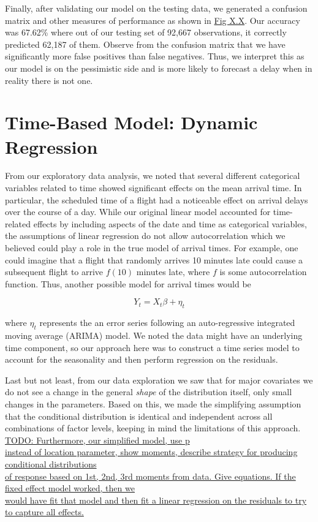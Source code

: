 \documentclass[12pt, a4paper, openany]{book}
\newcommand\tab[1][1cm]{\hspace*{#1}}
\begin{document}
	\tab Finally, after validating our model on the testing data, we generated a confusion matrix and other measures of performance as shown in \underline{Fig X.X}. Our accuracy was 67.62\% where out of our testing set of 92,667 observations, it correctly predicted 62,187 of them. Observe from the confusion matrix that we have significantly more false positives than false negatives. Thus, we interpret this as our model is on the pessimistic side and is more likely to forecast a delay when in reality there is not one. \\

	\section{Time-Based Model: Dynamic Regression}
	\tab From our exploratory data analysis, we noted that several different categorical variables related to time showed significant effects on the mean arrival time. In particular, the scheduled time of a flight had a noticeable effect on arrival delays over the course of a day. While our original linear model accounted for time-related effects by including aspects of the date and time as categorical variables, the assumptions of linear regression do not allow autocorrelation which we believed could play a role in the true model of arrival times. For example, one could imagine that a flight that randomly arrives 10 minutes late could cause a subsequent flight to arrive $f(10)$ minutes late, where $f$ is some autocorrelation function. Thus, another possible model for arrival times would be 
	\begin{center}
	$$Y_t = X_t\beta + \eta_t$$
	\end{center}
	where $\eta_t$ represents the an error series following an auto-regressive integrated moving average (ARIMA) model. We noted the data might have an underlying time component, so our approach here was to construct a time series model to account for the seasonality and then perform regression on the residuals. 

	\tab Last but not least, from our data exploration we saw that for major covariates we do not see a change in the general \textit{shape} of the distribution itself, only small changes in the parameters. Based on this, we made the simplifying assumption that the conditional distribution is identical and independent across all combinations of factor levels, keeping in mind the limitations of this approach.  \underline{TODO: Furthermore, our simplified model, use p \\
instead of location parameter, show moments, describe strategy for producing conditional distributions \\
of response based on 1st, 2nd, 3rd moments from data. Give equations. If the fixed effect model worked, then we \\
would have fit that model and then fit a linear regression on the residuals to try to capture all effects.} \\
	
\end{document}
